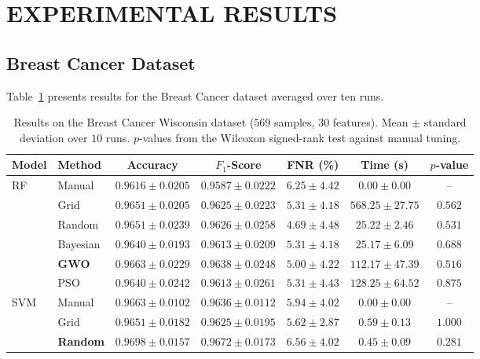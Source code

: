 \documentclass[letterpaper, 10 pt, conference]{ieeeconf}
\begin{document}
\section{EXPERIMENTAL RESULTS}
\label{sec:results}

\subsection{Breast Cancer Dataset}

Table~\ref{tab:bc_results} presents results for the Breast Cancer dataset averaged over ten runs.

\begin{table}[t]
	\caption{Results on the Breast Cancer Wisconsin dataset ($569$ samples, $30$ features). Mean $\pm$ standard deviation over $10$ runs. $p$-values from the Wilcoxon signed-rank test against manual tuning.}
	\label{tab:bc_results}
	\centering
	\scriptsize
	\begin{tabular}{|l|l|c|c|c|c|c|}
		\hline
		\textbf{Model} & \textbf{Method} & \textbf{Accuracy} & \textbf{$F_1$-Score} & \textbf{FNR (\%)} & \textbf{Time (s)} & \textbf{$p$-value} \\
		\hline
		\multirow{6}{*}{RF}
		& Manual   & $0.9616 \pm 0.0205$ & $0.9587 \pm 0.0222$ & $6.25 \pm 4.42$ & $0.00 \pm 0.00$ & -- \\
		& Grid     & $0.9651 \pm 0.0205$ & $0.9625 \pm 0.0223$ & $5.31 \pm 4.18$ & $568.25 \pm 27.75$ & $0.562$ \\
		& Random   & $0.9651 \pm 0.0239$ & $0.9626 \pm 0.0258$ & $4.69 \pm 4.48$ & $25.22 \pm 2.46$ & $0.531$ \\
		& Bayesian & $0.9640 \pm 0.0193$ & $0.9613 \pm 0.0209$ & $5.31 \pm 4.18$ & $25.17 \pm 6.09$ & $0.688$ \\
		& \textbf{GWO}      & $\mathbf{0.9663 \pm 0.0229}$ & $\mathbf{0.9638 \pm 0.0248}$ & $5.00 \pm 4.22$ & $112.17 \pm 47.39$ & $0.516$ \\
		& PSO      & $0.9640 \pm 0.0242$ & $0.9613 \pm 0.0261$ & $5.31 \pm 4.43$ & $128.25 \pm 64.52$ & $0.875$ \\
		\hline
		\multirow{6}{*}{SVM}
		& Manual   & $0.9663 \pm 0.0102$ & $0.9636 \pm 0.0112$ & $5.94 \pm 4.02$ & $0.00 \pm 0.00$ & -- \\
		& Grid     & $0.9651 \pm 0.0182$ & $0.9625 \pm 0.0195$ & $5.62 \pm 2.87$ & $0.59 \pm 0.13$ & $1.000$ \\
		& \textbf{Random}   & $\mathbf{0.9698 \pm 0.0157}$ & $\mathbf{0.9672 \pm 0.0173}$ & $6.56 \pm 4.02$ & $0.45 \pm 0.09$ & $0.281$ \\

\end{tabular}
\end{table}
\end{document}
